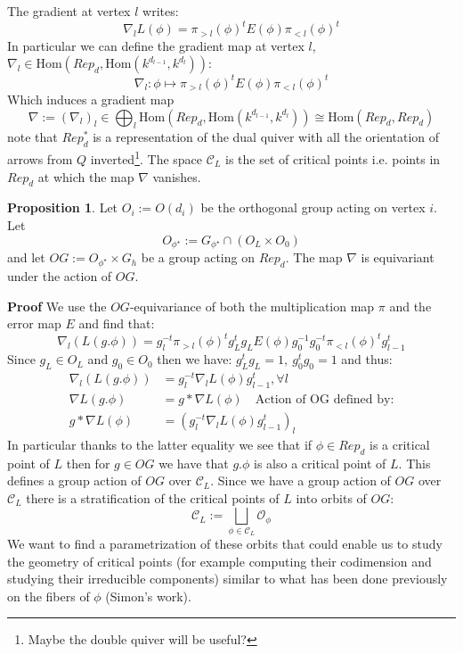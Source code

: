 \documentclass{article}
\theoremstyle{definition}
\newtheorem{proposition}[theorem]{Proposition}
\begin{document}
The gradient at vertex $l$ writes:
\begin{equation*}
    \nabla_l L(\phi) = \pi_{>l}(\phi)^{t}E(\phi)\pi_{<l}(\phi)^{t}
\end{equation*}
In particular we can define the gradient map at vertex $l$, $\nabla_l \in \text{Hom}(Rep_d, \text{Hom}(k^{d_{l-1}}, k^{d_{l}})) $:
\begin{equation*}
    \nabla_l: \phi \mapsto \pi_{>l}(\phi)^{t}E(\phi)\pi_{<l}(\phi)^{t}
\end{equation*} 
Which induces a gradient map $$\nabla:=(\nabla_l)_l \in \bigoplus_l  \text{Hom}(Rep_d, \text{Hom}(k^{d_{l-1}}, k^{d_{l}})) \cong \text{Hom}(Rep_d, Rep_d)$$ note that $Rep_d^{\ast}$ is a representation of the dual quiver with all the orientation of arrows from $Q$ inverted\footnote{Maybe the double quiver will be useful?}. The space $\mathcal{C}_L$ is the set of critical points i.e. points in $Rep_d$ at which the map $\nabla$ vanishes. 
\begin{proposition}
    Let $O_i:=O(d_i)$ be the orthogonal group acting on vertex $i$. Let $$O_{\phi^{\star}}:=G_{\phi^{\star}} \cap
 (O_L \times O_0)$$ and let $OG:= O_{\phi^{\star}} \times G_h$ be a group acting on $Rep_d$. The map $\nabla$ is equivariant under the action of $OG$.
\end{proposition}
\textbf{Proof} We use the $OG$-equivariance of both the multiplication map $\pi$ and the error map $E$ and find that:
\begin{equation*}
    \nabla_l (L(g.\phi)) = g_{l}^{-t} \pi_{>l}(\phi)^{t} g_L^{t}g_L E(\phi) g_0^{-1}g_0^{-t}\pi_{<l}(\phi)^{t}g_{l-1}^{t}
\end{equation*}
Since $g_L\in O_{L}$ and $g_0\in O_{0}$ then we have: $g_L^{t}g_L= 1, \ g_0^{t}g_0=1$ and thus:
\begin{align*}
    \nabla_l (L(g.\phi)) & = g_{l}^{-t} \nabla_l L(\phi) g_{l-1}^t, \forall l\\
    \nabla L(g.\phi) & = g \ast \nabla L(\phi) \quad \text{Action of OG defined by:}\\
    g \ast \nabla L(\phi) & = (g_{l}^{-t} \nabla_l L(\phi) g_{l-1}^t)_l
\end{align*}
In particular thanks to the latter equality we see that if $\phi \in Rep_d$ is a critical point of $L$ then for $g\in OG$ we have that $g.\phi$ is also a critical point of $L$. This defines a group action of $OG$ over $\mathcal{C}_L$. Since we have a group action of $OG$ over $\mathcal{C}_L$ there is a stratification of the critical points of $L$ into orbits of $OG$:
\begin{equation*}
    \mathcal{C}_L := \bigsqcup_{\phi\in \mathcal{C}_L} \mathcal{O}_{\phi}
\end{equation*}
We want to find a parametrization of these orbits that could enable us to study the geometry of critical points (for example computing their codimension and studying their irreducible components) similar to what has been done previously on the fibers of $\phi$ (Simon's work).
\end{document}
